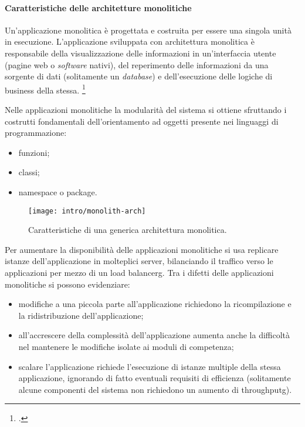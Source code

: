 \paragraph{Caratteristiche delle architetture monolitiche}

Un'applicazione monolitica è progettata e costruita per essere una singola unità in esecuzione.
L'applicazione sviluppata con architettura monolitica è responsabile della visualizzazione delle informazioni in un'interfaccia utente (pagine web o \emph{software} nativi), del reperimento delle informazioni da una sorgente di dati (solitamente un \emph{database}) e dell'esecuzione delle logiche di business della stessa.
\footcite{book:beginning-sw-eng}

Nelle applicazioni monolitiche la modularità del sistema si ottiene sfruttando i costrutti fondamentali dell'orientamento ad oggetti presente nei linguaggi di programmazione:
\begin{itemize}
  \item funzioni;
  \item classi;
  \item namespace o package.
\end{itemize}

\begin{figure}[H]
    \centering
    \texttt{[image: intro/monolith-arch]}
    \caption{Caratteristiche di una generica architettura monolitica.\\ \cite{site:fowler-microservices}}
    \label{fig:monolith-arch}
\end{figure}

Per aumentare la disponibilità delle applicazioni monolitiche si usa replicare istanze dell'applicazione in molteplici server, bilanciando il traffico verso le applicazioni per mezzo di un \gls{load balancerg}.
Tra i difetti delle applicazioni monolitiche si possono evidenziare:
\begin{itemize}
  \item modifiche a una piccola parte all'applicazione richiedono la ricompilazione e la ridistribuzione dell'applicazione;
  \item all'accrescere della complessità dell'applicazione aumenta anche la difficoltà nel mantenere le modifiche isolate ai moduli di competenza;
  \item scalare l'applicazione richiede l'esecuzione di istanze multiple della stessa applicazione, ignorando di fatto eventuali requisiti di efficienza (solitamente alcune componenti del sistema non richiedono un aumento di \gls{throughputg}).
\end{itemize}

